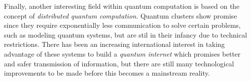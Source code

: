 \documentclass[../../dissertation.tex]{subfiles}
\begin{document}
Finally, another interesting field within quantum computation is based on the
concept of \textit{distributed quantum computation}. Quantum clusters show
promise since they require exponentially less communication to solve certain
problems, such as modeling quantum systems, but are stil in their infancy due
to technical restrictions. There has been an increasing international interest in
taking advantage of these systems to build a \textit{quantum internet} which
promises better and safer transmission of information, but there are still many
technological improvements to be made before this becomes a mainstream reality. 

\end{document}

